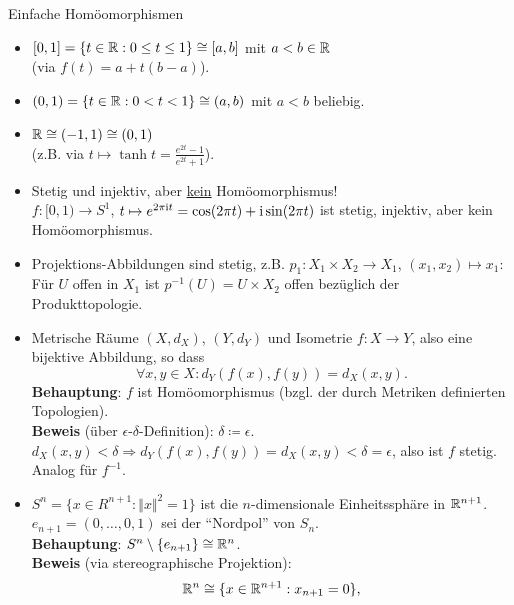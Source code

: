 \begin{example}{Einfache Homöomorphismen}
  \begin{itemize}
    \item $ [0,1] = \{ t \in \mathbb{R} : 0 \leq t \leq 1 \} \cong [a,b] $ mit $ a < b \in \mathbb{R} $ \\ (via $ f(t) = a+t(b-a) $).
    \item $ (0,1) = \{ t \in \mathbb{R} : 0 < t < 1 \} \cong (a,b) $ mit $ a < b $ beliebig. 
    \item $ \mathbb{R} \cong (-1, 1) \cong (0,1) $ \\ (z.B. via $ t \mapsto \tanh t = \tfrac{e^{2t}-1}{e^{2t}+1} $).
    \item Stetig und injektiv, aber \underline{kein} Homöomorphismus! \\
      $ f: [0,1) \to S^1 $, $ t \mapsto e^{2\pi\text{\rmfamily i} t} = \cos(2\pi t) + \text{\rmfamily i}\sin(2\pi t) $ ist stetig, injektiv, aber kein Homöomorphismus.
    \item Projektions-Abbildungen sind stetig, z.B. $ p_1: X_1 \times X_2 \to X_1 $, $ (x_1,x_2) \mapsto x_1 $: Für $ U $ offen in $ X_1 $ ist $ p^{-1}(U) = U \times X_2 $ offen bezüglich der Produkttopologie.
    \item Metrische Räume $ (X, d_X) $, $ (Y, d_Y) $ und Isometrie $ f: X \to Y $, also eine bijektive Abbildung, so dass
      \begin{equation*}
        \forall x, y \in X : d_Y(f(x), f(y)) = d_X(x, y)\text{.}
      \end{equation*}
      \textbf{Behauptung}: $ f $ ist Homöomorphismus (bzgl. der durch Metriken definierten Topologien). \\
      \textbf{Beweis} (über $ \epsilon $-$ \delta $-Definition): $ \delta \coloneqq \epsilon $. \\
        $ d_X(x, y) < \delta \Rightarrow d_Y(f(x), f(y)) = d_X(x,y) < \delta = \epsilon $, also ist $ f $ stetig. \\
        Analog für $ f^{-1} $.
    \item $ S^n = \{ x \in R^{n+1} : \Vert x \Vert^2 = 1 \} $ ist die $ n $-dimensionale Einheitssphäre in $ \mathbb{R}^{n+1} $. \\
      $ e_{n+1} = (0,\dots,0,1) $ sei der ``Nordpol'' von $ S_n $. \\
      \textbf{Behauptung}: $ S^n\setminus\{ e_{n+1} \} \cong \mathbb{R}^n $. \\
      \textbf{Beweis} (via stereographische Projektion):
      \begin{equation*}
        \R^n \cong \{ x \in \R^{n+1} : x_{n+1} = 0 \}\text{,}

\end{equation*}
\end{itemize}
\end{example}
